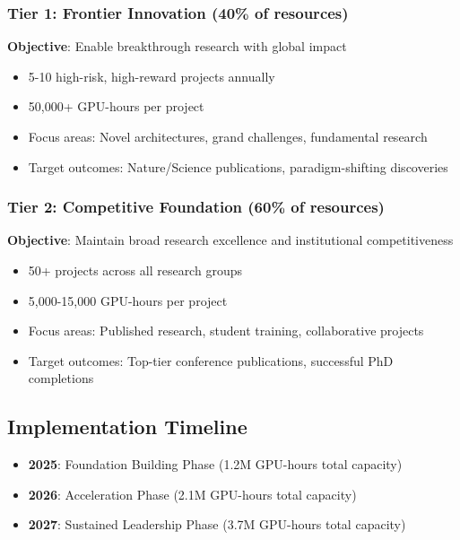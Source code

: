 \documentclass{article}
\begin{document}
\subsubsection{Tier 1: Frontier Innovation (40\% of resources)}

\textbf{Objective}: Enable breakthrough research with global impact

\begin{itemize}
\item 5-10 high-risk, high-reward projects annually
\item 50,000+ GPU-hours per project
\item Focus areas: Novel architectures, grand challenges, fundamental research
\item Target outcomes: Nature/Science publications, paradigm-shifting discoveries
\end{itemize}

\subsubsection{Tier 2: Competitive Foundation (60\% of resources)}

\textbf{Objective}: Maintain broad research excellence and institutional competitiveness

\begin{itemize}
\item 50+ projects across all research groups
\item 5,000-15,000 GPU-hours per project
\item Focus areas: Published research, student training, collaborative projects
\item Target outcomes: Top-tier conference publications, successful PhD completions
\end{itemize}

\subsection{Implementation Timeline}

\begin{itemize}
\item \textbf{2025}: Foundation Building Phase (1.2M GPU-hours total capacity)
\item \textbf{2026}: Acceleration Phase (2.1M GPU-hours total capacity)
\item \textbf{2027}: Sustained Leadership Phase (3.7M GPU-hours total capacity)
\end{itemize}
\end{document}
